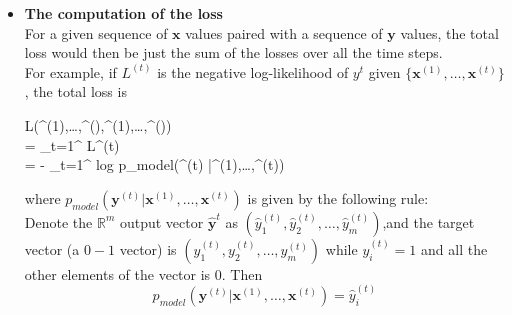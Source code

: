 \begin{itemize}
		\item
		\textbf{The computation of the loss} \\
		For a given sequence of $\mathbf{x}$ values paired with a sequence of $\mathbf{y}$ values, the total loss would then be just the sum of the losses over all the time steps.\\
		For example, if $L^{(t)}$ is the negative log-likelihood of $y^{t}$ given $\{\mathbf{x}^{(1)},\ldots,\mathbf{x}^{(t)} \}$, the total loss is
		\begin{flalign*}
		L({^{(1)},\ldots,^{(\tau)}},{^{(1)},\ldots,^{(\tau)}}) \\
		= \sum_{t=1}^{\tau} L^{(t)}  \\
		= - \sum_{t=1}^{\tau} log p_{model}(^{(t)} |{^{(1)},\ldots,^{(t)}}) 
		\end{flalign*}
		where $p_{model}(\mathbf{y}^{(t)} |{\mathbf{x}^{(1)},\ldots,\mathbf{x}^{(t)}}) $ is given by the following rule:\\
		Denote the $\mathbb{R}^m$ output vector $\hat{\mathbf{y}}^{t}$ as $(\hat{y}_1^{(t)},\hat{y}_2^{(t)},\dots,\hat{y}_m^{(t)})$,and the target vector (a $0-1$ vector) is $(y_1^{(t)},y_2^{(t)},\dots,y_m^{(t)})$ while $y_i^{(t)} = 1$ and all the other elements of the vector is 0. Then 
		\begin{equation}
		p_{model}(\mathbf{y}^{(t)} |{\mathbf{x}^{(1)},\ldots,\mathbf{x}^{(t)}}) = \hat{y}_i^{(t)}
		\end{equation}
	\end{itemize}

